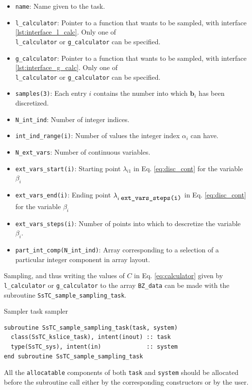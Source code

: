 \documentclass[10pt,a4paper]{article}
\begin{document}
\begin{tcolorbox}
\begin{itemize}
\item \verb|name|: Name given to the task.
\item \verb|l_calculator|: Pointer to a function that wants to be sampled, with interface \ref{lst:interface_l_calc}. Only one of \\ \verb|l_calculator| or \verb|g_calculator| can be specified.
\item \verb|g_calculator|: Pointer to a function that wants to be sampled, with interface \ref{lst:interface_g_calc}. Only one of \\ \verb|l_calculator| or \verb|g_calculator| can be specified.
\item \verb|samples(3)|: Each entry $i$ contains the number into which $\bm{b}_i$ has been discretized.
\item \verb|N_int_ind|: Number of integer indices.
\item \verb|int_ind_range(i)|: Number of values the integer index $\alpha_i$ can have.
\item \verb|N_ext_vars|: Number of continuous variables.
\item \verb|ext_vars_start(i)|: Starting point $\lambda_{i1}$ in Eq. \eqref{eq:disc_cont} for the variable $\beta_i$
\item \verb|ext_vars_end(i)|: Ending point $\lambda_{i\;\verb|ext_vars_steps(i)|}$ in Eq. \eqref{eq:disc_cont} for the variable $\beta_i$
\item \verb|ext_vars_steps(i)|: Number of points into which to descretize the variable $\beta_i$.
\item \verb|part_int_comp(N_int_ind)|: Array corresponding to a selection of a particular integer component in array layout.
\end{itemize}
\end{tcolorbox}
Sampling, and thus writing the values of $C$ in Eq. \eqref{eq:calculator} given by \verb|l_calculator| or \verb|g_calculator| to the array \verb|BZ_data| can be made with the subroutine \verb|SsTC_sample_sampling_task|.
\begin{codebox}{Sampler task sampler}
\begin{lstlisting}[caption={Interface of the ``sampler" sampler.},captionpos=b]
subroutine SsTC_sample_sampling_task(task, system)
  class(SsTC_kslice_task), intent(inout) :: task
  type(SsTC_sys), intent(in)             :: system
end subroutine SsTC_sample_sampling_task
\end{lstlisting}
\end{codebox}
All the \verb|allocatable| components of both \verb|task| and \verb|system| should be allocated before the subroutine call either by the corresponding constructors or by the user.
\end{document}
